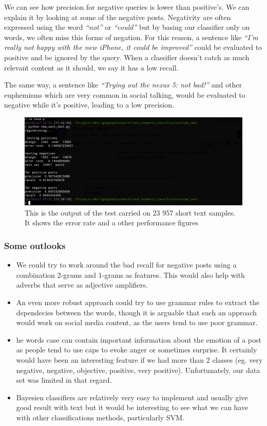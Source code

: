 We can see how precision for negative queries is lower than positive’s. We can explain it by looking at some of the negative posts. 
Negativity are often expressed using the word \textit{“not”} or \textit{``could''} but by basing our classifier only on words, we often miss this forms of negation. 
For this reason, a sentence like \textit{“I’m really not happy with the new iPhone, it could be improved”} could be evaluated to positive and be 
ignored by the query. When a classifier doesn’t catch as much relevant content as it should, we say it has a low recall.

The same way, a sentence like \textit{“Trying out the nexus 5: not bad!”} and other euphemisms which are very common in social talking, would be 
evaluated to negative while it’s positive, leading to a low precision.

\begin{figure}[h]
\centering
\includegraphics[scale=.4]{images/sent2.png}
\caption{This is the output of the test carried on 23 957 short text samples. It shows the error rate and a other performance figures}
\end{figure}



\subsubsection*{Some outlooks}
\begin{itemize}
 \item 
 We could try to work around the bad recall for negative posts using a combination 2-grams and 1-grams as features. This would also help with adverbs that serve as adjective amplifiers.
\item 
An even more robust approach could try to use grammar rules to extract the dependecies between the words, though it is arguable that such an approach would work on social media content, as the users tend to use poor grammar. 
\item 
he words case can contain important information about the emotion of a post as people tend to use caps to evoke anger or sometimes surprise. It certainly would have been an interesting feature if we had more than 2 classes (eg. very negative, negative, objective, positive, very positive). Unfortunately, our data set was limited in that regard.
\item 
Bayesien classifiers are relatively very easy to implement and usually give good result with text but it would be interesting to see what we can have with other classifications methods, particularly SVM. 

\end{itemize}

